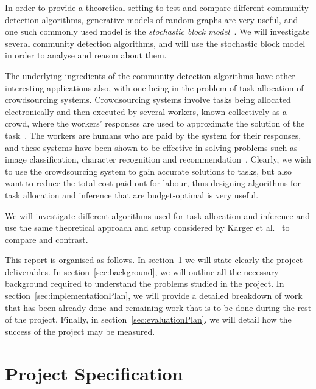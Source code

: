 \documentclass[12pt]{article}
\numberwithin{equation}{section}
\begin{document}
In order to provide a theoretical setting to test and compare different community detection algorithms, generative models of random graphs are very useful, and one such commonly used model is the \textit{stochastic block model}~\cite{DKM+13}. We will investigate several community detection algorithms, and will use the stochastic block model in order to analyse and reason about them.

The underlying ingredients of the community detection algorithms have other interesting applications also, with one being in the problem of task allocation of crowdsourcing systems. Crowdsourcing systems involve tasks being allocated electronically and then executed by several workers, known collectively as a crowd, where the workers' responses are used to approximate the solution of the task~\cite{KOS13,EHR12}. The workers are humans who are paid by the system for their responses, and these systems have been shown to be effective in solving problems such as image classification, character recognition and recommendation~\cite{KOS13}. Clearly, we wish to use the crowdsourcing system to gain accurate solutions to tasks, but also want to reduce the total cost paid out for labour, thus designing algorithms for task allocation and inference that are budget-optimal is very useful.

We will investigate different algorithms used for task allocation and inference and use the same theoretical approach and setup considered by Karger et al.~\cite{KOS13} to compare and contrast.

This report is organised as follows. In section~\ref{sec:projectSpecification} we will state clearly the project deliverables. In section~\ref{sec:background}, we will outline all the necessary background required to understand the problems studied in the project. In section~\ref{sec:implementationPlan}, we will provide a detailed breakdown of work that has been already done and remaining work that is to be done during the rest of the project. Finally, in section~\ref{sec:evaluationPlan}, we will detail how the success of the project may be measured.


\newpage
\thispagestyle{plain}
\mbox{}
\section {Project Specification}
\label{sec:projectSpecification}
\end{document}
